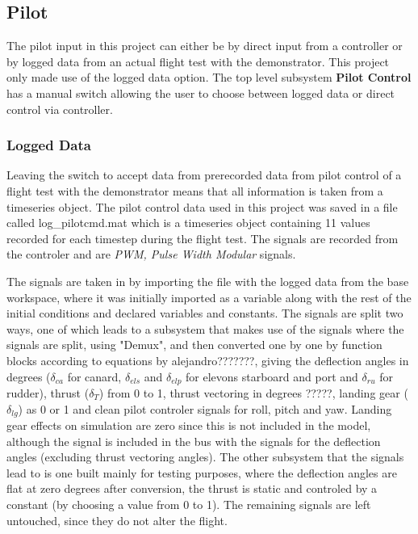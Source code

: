 \subsection{Pilot}

The pilot input in this project can either be by direct input from a controller or by logged data from an actual flight test with the demonstrator. This project only made use of the logged data option. The top level subsystem \textbf{Pilot Control} has a manual switch allowing the user to choose between logged data or direct control via controller.

\subsubsection{Logged Data}

Leaving the switch to accept data from prerecorded data from pilot control of a flight test with the demonstrator means that all information is taken from a timeseries object. The pilot control data used in this project was saved in a file called log\_pilotcmd.mat which is a timeseries object containing 11 values recorded for each timestep during the flight test. The signals are recorded from the controler and are \textit{PWM, Pulse Width Modular} signals.

The signals are taken in by importing the file with the logged data from the base workspace, where it was initially imported as a variable along with the rest of the initial conditions and declared variables and constants. The signals are split two ways, one of which leads to a subsystem that makes use of the signals where the signals are split, using "Demux", and then converted one by one by function blocks according to equations by alejandro???????, giving the deflection angles in degrees ($\delta_{ca}$ for canard, $\delta_{els}$ and $\delta_{elp}$ for elevons starboard and port and $\delta_{ru}$ for rudder), thrust ($\delta_{T}$) from 0 to 1, thrust vectoring in degrees ?????, landing gear ($\delta_{lg}$) as 0 or 1 and clean pilot controler signals for roll, pitch and yaw. Landing gear effects on simulation are zero since this is not included in the model, although the signal is included in the bus with the signals for the deflection angles (excluding thrust vectoring angles). The other subsystem that the signals lead to is one built mainly for testing purposes, where the deflection angles are flat at zero degrees after conversion, the thrust is static and controled by a constant (by choosing a value from 0 to 1). The remaining signals are left untouched, since they do not alter the flight.

